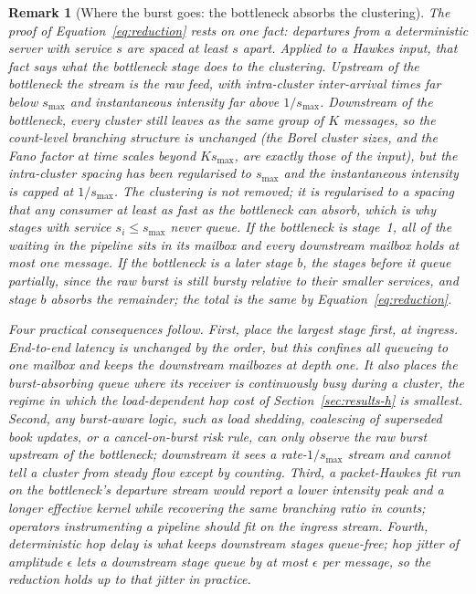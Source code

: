 \documentclass[11pt]{article}
\newtheorem{remark}{Remark}[section]
\begin{document}
\begin{remark}[Where the burst goes: the bottleneck absorbs the clustering]
\label{rem:dissipation}
The proof of Equation~\eqref{eq:reduction} rests on one fact: departures from a
deterministic server with service $s$ are spaced at least $s$ apart. Applied to a Hawkes
input, that fact says what the bottleneck stage does to the clustering. Upstream of the
bottleneck the stream is the raw feed, with intra-cluster inter-arrival times far below
$s_{\max}$ and instantaneous intensity far above $1/s_{\max}$. Downstream of the
bottleneck, every cluster still leaves as the same group of $K$ messages, so the
count-level branching structure is unchanged (the Borel cluster sizes, and the Fano factor
at time scales beyond $K s_{\max}$, are exactly those of the input), but the intra-cluster
spacing has been regularised to $s_{\max}$ and the instantaneous intensity is capped at
$1/s_{\max}$. The clustering is not removed; it is regularised to a spacing that any consumer at
least as fast as the bottleneck can absorb, which is why stages with service $s_i \le
s_{\max}$ never queue. If the bottleneck is stage~1, all of the waiting in the pipeline sits in its mailbox
and every downstream mailbox holds at most one message. If the bottleneck is a later
stage $b$, the stages before it queue partially, since the raw burst is still bursty
relative to their smaller services, and stage $b$ absorbs the remainder; the total is the
same by Equation~\eqref{eq:reduction}.

Four practical consequences follow. First, place the largest stage first, at ingress. End-to-end latency is unchanged by
the order, but this confines all queueing to one mailbox and keeps the downstream
mailboxes at depth one. It also places the burst-absorbing queue where its receiver is
continuously busy during a cluster, the regime in which the load-dependent hop cost of
Section~\ref{sec:results-h} is smallest. Second, any burst-aware logic, such as load shedding, coalescing of superseded
book updates, or a cancel-on-burst risk rule, can only observe the raw burst upstream of
the bottleneck; downstream it sees a rate-$1/s_{\max}$ stream and cannot tell a cluster
from steady flow except by counting. Third, a packet-Hawkes fit run on the bottleneck's
departure stream would report a lower intensity peak and a longer effective kernel while
recovering the same branching ratio in counts; operators instrumenting a pipeline should
fit on the ingress stream. Fourth, deterministic hop delay is what keeps downstream stages
queue-free; hop jitter of amplitude $\epsilon$ lets a downstream stage queue by at most
$\epsilon$ per message, so the reduction holds up to that jitter in practice.
\end{remark}
\end{document}
